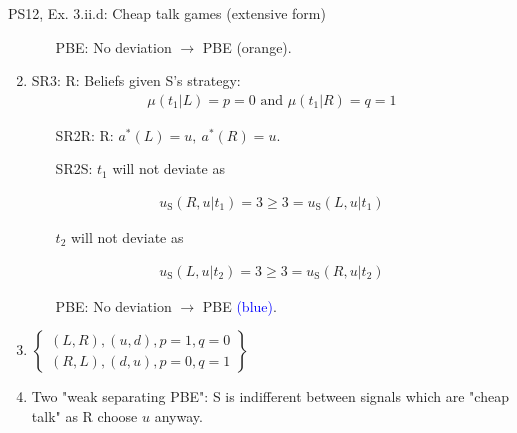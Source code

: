 \begin{frame}{PS12, Ex. 3.ii.d: Cheap talk games (extensive form)}
\begin{multicols}{2}
\begin{enumerate}
        \begin{itemize}\normalsize
          \item[PBE:] No deviation $\rightarrow$ PBE \textcolor{YellowOrange}{(orange)}.
        \end{itemize}\vspace{-5pt}
        \item SR3: R: Beliefs given S's strategy:\vspace{-8pt}
        \begin{align*}
          \mu(t_1|L)=p=0\text{ and }\mu(t_1|R)=q=1
        \end{align*}\vspace{-18pt}
        \begin{itemize}\normalsize
          \item[SR2R:] R: $a^*(L)=u,\ a^*(R)=u$.
          \item[SR2S:] $t_1$ will not deviate as
        \end{itemize}\vspace{-10pt}
        \begin{align*}
          u_\text{S}(R,u|t_1)=3\geq 3=u_\text{S}(L,u|t_1)
        \end{align*}\vspace{-18pt}
        \begin{itemize}\normalsize
          \item[] $t_2$ will not deviate as
        \end{itemize}\vspace{-10pt}
        \begin{align*}
          u_\text{S}(L,u|t_2)=3\geq3=u_\text{S}(R,u|t_2)
        \end{align*}\vspace{-18pt}
        \begin{itemize}\normalsize
          \item[PBE:] No deviation $\rightarrow$ PBE \textcolor{blue}{(blue)}.
        \end{itemize}\vspace{-4pt}
        \item $\left\{\begin{array}{c}
            (L,R),(u,d),p=1,q=0\\
            (R,L),(d,u),p=0,q=1\end{array}\right\}$
        \item \vspace{-1pt}Two "weak separating PBE": S is indifferent between signals which are "cheap talk" as R choose $u$ anyway.
      \end{enumerate}
      \vfill\null
    \end{multicols}
\end{frame}
